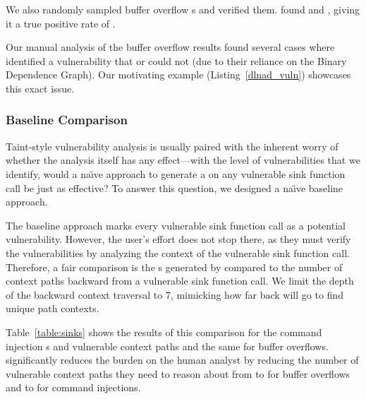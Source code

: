 We also randomly sampled \manualAnalysisOverflowTotal \mango buffer overflow \trupoc{}s and verified them.
\mango found \manualAnalysisOverflowTrueTP and \manualAnalysisOverflowTrueFP, giving it a true positive rate of \manualAnalysisOverflowTPRatio.

Our manual analysis of the buffer overflow results found several cases where \mango identified a vulnerability that \karonte or \satc could not (due to their reliance on the Binary Dependence Graph).
Our motivating example (Listing~\ref{dlnad_vuln}) showcases this exact issue.


\subsubsection{Baseline Comparison}
\label{sec:baseline}


Taint-style vulnerability analysis is usually paired with the inherent worry of whether the analysis itself has any effect---with the level of vulnerabilities that we identify, would a na\"{\i}ve approach to generate a \trupoc on any vulnerable sink function call be just as effective?
To answer this question, we designed a na\"{\i}ve baseline approach.

The baseline approach marks every vulnerable sink function call as a potential vulnerability.
However, the user's effort does not stop there, as they must verify the vulnerabilities by analyzing the context of the vulnerable sink function call.
Therefore, a fair comparison is the \trupoc{}s generated by \mango compared to the number of context paths backward from a vulnerable sink function call.
We limit the depth of the backward context traversal to 7, mimicking how far back \mango will go to find unique path contexts.

Table~\ref{table:sinks} shows the results of this comparison for the command injection \mango \trupoc{}s and vulnerable context paths and the same for buffer overflows.
\mango significantly reduces the burden on the human analyst by reducing the number of vulnerable context paths they need to reason about from \contextOverflow to \alertedOverflow for buffer overflows and \contextCmdi to \alertedCmdi for command injections.


